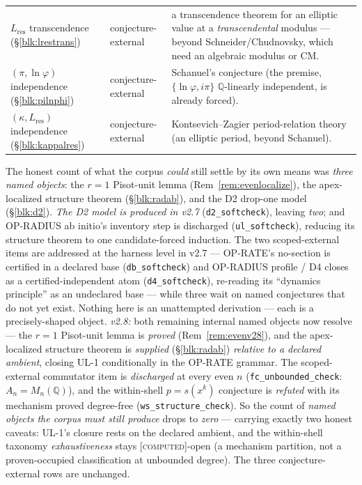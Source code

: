 \documentclass[11pt]{article}
\newcommand{\tagC}{\textcolor{cC}{\textsc{[computed]}}}
\newcommand{\Q}{\mathbb{Q}}
\newcommand{\gp}{\varphi}
\theoremstyle{plain}
\theoremstyle{definition}
\theoremstyle{remark}
\begin{document}
\begin{center}
\begin{tabular}{@{}p{3.5cm}p{1.9cm}p{8.3cm}@{}}
$L_{\mathrm{res}}$ transcendence (\S\ref{blk:lrestrans}) & conjecture-external & a transcendence theorem for an elliptic value at a \emph{transcendental} modulus --- beyond Schneider/Chudnovsky, which need an algebraic modulus or CM.\\[2pt]
$(\pi,\ln\gp)$ independence (\S\ref{blk:pilnphi}) & conjecture-external & Schanuel's conjecture (the premise, $\{\ln\gp,i\pi\}$ $\Q$-linearly independent, is already forced).\\[2pt]
$(\kappa,L_{\mathrm{res}})$ independence (\S\ref{blk:kappalres}) & conjecture-external & Kontsevich--Zagier period-relation theory (an elliptic period, beyond Schanuel).\\
\bottomrule
\end{tabular}
\end{center}
\noindent The honest count of what the corpus \emph{could} still settle by its own
means was \emph{three named objects}: the $r=1$ Pisot-unit lemma
(Rem~\ref{rem:evenlocalize}), the apex-localized structure theorem
(\S\ref{blk:radab}), and the D2 drop-one model (\S\ref{blk:d2}). \emph{The D2 model
is produced in v2.7} (\texttt{d2\_softcheck}), leaving \emph{two}; and OP-RADIUS ab
initio's inventory step is discharged (\texttt{ul\_softcheck}), reducing its
structure theorem to one candidate-forced induction. The two scoped-external items
are addressed at the harness level in v2.7 --- OP-RATE's no-section is certified in a
declared base (\texttt{db\_softcheck}) and OP-RADIUS profile / D4 closes as a
certified-independent atom (\texttt{d4\_softcheck}), re-reading its ``dynamics
principle'' as an undeclared base --- while three wait on named conjectures that do
not yet exist. Nothing here is an unattempted derivation --- each is a
precisely-shaped object. \emph{v2.8:} both remaining internal named objects now
resolve --- the $r=1$ Pisot-unit lemma is \emph{proved} (Rem~\ref{rem:evenv28}), and
the apex-localized structure theorem is \emph{supplied} (\S\ref{blk:radab})
\emph{relative to a declared ambient}, closing UL-1 conditionally in the OP-RATE
grammar. The scoped-external commutator item is \emph{discharged} at every even $n$
(\texttt{fc\_unbounded\_check}: $A_n=M_n(\Q)$), and the within-shell $p=s(x^k)$
conjecture is \emph{refuted} with its mechanism proved degree-free
(\texttt{ws\_structure\_check}). So the count of \emph{named objects the corpus must
still produce} drops to \emph{zero} --- carrying exactly two honest caveats: UL-1's
closure rests on the declared ambient, and the within-shell taxonomy
\emph{exhaustiveness} stays \tagC{}-open (a mechanism partition, not a
proven-occupied classification at unbounded degree). The three conjecture-external
rows are unchanged.
\end{document}
